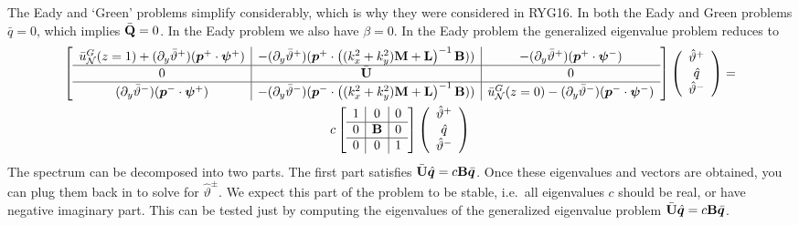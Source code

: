 \documentclass[10pt]{article}
\newcommand{\pd}[1]{\partial_{#1}}
\newcommand{\sN}{\mathcal{N}}
\newcommand{\mat}[1]{\text{\bf #1}}
\begin{document}
The Eady and `Green' problems simplify considerably, which is why they were considered in RYG16.
In both the Eady and Green problems $\bar{q} = 0$, which implies $\bar{\mat{Q}}=0$.
In the Eady problem we also have $\beta=0$.
In the Eady problem the generalized eigenvalue problem reduces to 
\begin{multline}
\left[\begin{array}{c|c|c}
\bar{u}_\sN^G(z=1)+(\pd{y}\bar\vartheta^+)(\bm{p}^+\cdot\bm{\psi}^+)&-(\pd{y}\bar\vartheta^+)(\bm{p}^+\cdot\left((k_x^2+k_y^2)\mat{M}+\mat{L}\right)^{-1}\mat{B}))&-(\pd{y}\bar\vartheta^+)(\bm{p}^+\cdot\bm{\psi}^-)\\\hline
0&\bar{\mat{U}}&0\\\hline
 (\pd{y}\bar\vartheta^-)(\bm{p}^-\cdot\bm{\psi}^+)&-(\pd{y}\bar\vartheta^-)(\bm{p}^-\cdot\left((k_x^2+k_y^2)\mat{M}+\mat{L}\right)^{-1}\mat{B}))&\bar{u}_\sN^G(z=0)-(\pd{y}\bar\vartheta^-)(\bm{p}^-\cdot\bm{\psi}^-)
\end{array}\right]\left(\begin{array}{c}\hat{\vartheta}^+\\\hat{q}\\\hat{\vartheta}^-\end{array}\right) = \\
c\left[\begin{array}{c|c|c}
1&0&0\\\hline
0&\mat{B}&0\\\hline
0&0&1
\end{array}\right]\left(\begin{array}{c}\hat{\vartheta}^+\\\hat{q}\\\hat{\vartheta}^-\end{array}\right)
\end{multline}
The spectrum can be decomposed into two parts.
The first part satisfies $\bar{\mat{U}}\hat{\bm{q}} = c\mat{B}\bar{\bm{q}}$.
Once these eigenvalues and vectors are obtained, you can plug them back in to solve for $\hat{\vartheta}^\pm$.
We expect this part of the problem to be stable, i.e.~all eigenvalues $c$ should be real, or have negative imaginary part.
This can be tested just by computing the eigenvalues of the generalized eigenvalue problem $\bar{\mat{U}}\hat{\bm{q}} = c\mat{B}\bar{\bm{q}}$.
\end{document}
